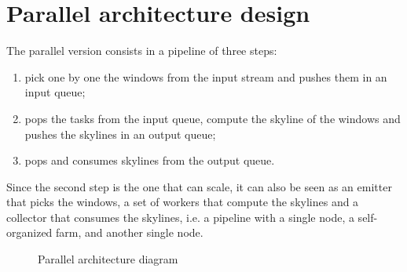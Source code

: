 \section{Parallel architecture design}

The parallel version consists in a pipeline of three steps:
\begin{enumerate}
    \item pick one by one the windows from the input stream and pushes them in an input queue;
    \item pops the tasks from the input queue, compute the skyline of the windows and pushes the skylines in an output queue;
    \item pops and consumes skylines from the output queue.
\end{enumerate}

\noindent
Since the second step is the one that can scale, it can also be seen as an emitter that picks the windows, a set of workers that compute the skylines and a collector that consumes the skylines, i.e. a pipeline with a single node, a self-organized farm, and another single node.

\bigskip\noindent
\begin{figure}[h]
    \centering
    
    \bigskip
    \caption{Parallel architecture diagram}
    \label{fig:parallel_diagram}
\end{figure}